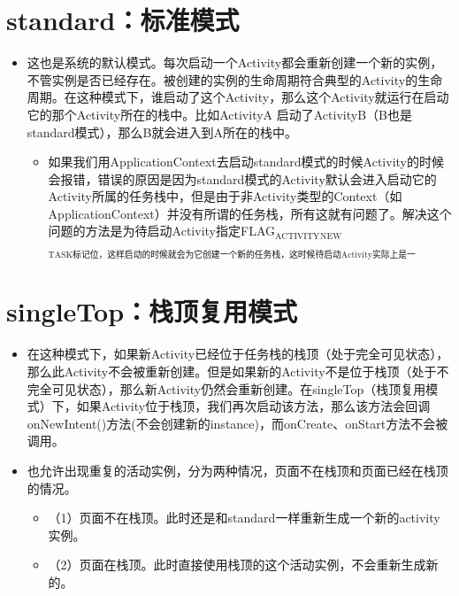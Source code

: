 \documentclass[9pt, b5paaper]{book}
\begin{document}
\section{standard：标准模式}
\label{sec-4-1}
\begin{itemize}
\item 这也是系统的默认模式。每次启动一个Activity都会重新创建一个新的实例，不管实例是否已经存在。被创建的实例的生命周期符合典型的Activity的生命周期。在这种模式下，谁启动了这个Activity，那么这个Activity就运行在启动它的那个Activity所在的栈中。比如ActivityA 启动了ActivityB（B也是standard模式），那么B就会进入到A所在的栈中。
\begin{itemize}
\item 如果我们用ApplicationContext去启动standard模式的时候Activity的时候会报错，错误的原因是因为standard模式的Activity默认会进入启动它的Activity所属的任务栈中，但是由于非Activity类型的Context（如ApplicationContext）并没有所谓的任务栈，所有这就有问题了。解决这个问题的方法是为待启动Activity指定FLAG$_{\text{ACTIVITY}}$$_{\text{NEW}}$$_{\text{TASK标记位，这样启动的时候就会为它创建一个新的任务栈，这时候待启动Activity实际上是一singleTask模式启动的。后文会再次强调一下}}$
\end{itemize}
\end{itemize}

\section{singleTop：栈顶复用模式}
\label{sec-4-2}
\begin{itemize}
\item 在这种模式下，如果新Activity已经位于任务栈的栈顶（处于完全可见状态），那么此Activity不会被重新创建。但是如果新的Activity不是位于栈顶（处于不完全可见状态），那么新Activity仍然会重新创建。在singleTop（栈顶复用模式）下，如果Activity位于栈顶，我们再次启动该方法，那么该方法会回调onNewIntent()方法(不会创建新的instance)，而onCreate、onStart方法不会被调用。
\item 也允许出现重复的活动实例，分为两种情况，页面不在栈顶和页面已经在栈顶的情况。
\begin{itemize}
\item （1）页面不在栈顶。此时还是和standard一样重新生成一个新的activity实例。
\item （2）页面在栈顶。此时直接使用栈顶的这个活动实例，不会重新生成新的。
\end{itemize}
\end{itemize}
\end{document}
